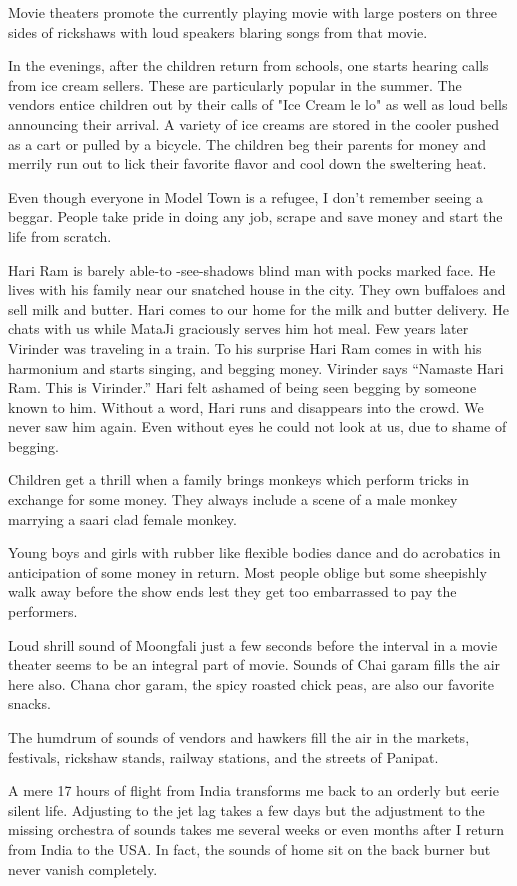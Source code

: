 Movie theaters promote the currently playing movie with large posters on
three sides of rickshaws with loud speakers blaring songs from that movie. 

In the evenings, after the children return from schools, one starts
hearing calls from ice cream sellers. These are particularly popular in
the summer. The vendors entice children out by their calls of "Ice Cream
le lo" as well as loud bells announcing their arrival. A variety of ice
creams are stored in the cooler pushed as a cart or pulled by a bicycle.
The children beg their parents for money and merrily run out to lick their
favorite flavor and cool down the sweltering heat. 

Even though everyone in Model Town is a refugee, I don’t remember seeing
a beggar. People take pride in doing any job, scrape and save money and
start the life from scratch. 

Hari Ram is barely able-to -see-shadows blind man with pocks marked face.
He lives with his family near our snatched house in the city. They own
buffaloes and sell milk and butter. Hari comes to our home for the milk
and butter delivery. He chats with us while MataJi graciously serves him
hot meal. Few years later Virinder was traveling in a train. To his
surprise Hari Ram comes in with his harmonium and starts singing, and
begging money. Virinder says “Namaste Hari Ram. This is Virinder.” Hari
felt ashamed of being seen begging by someone known to him. Without
a word, Hari runs and disappears into the crowd. We never saw him again.
Even without eyes he could not look at us, due to shame of begging. 

Children get a thrill when a family brings monkeys which perform tricks in
exchange for some money. They always include a scene of a male monkey
marrying a saari clad female monkey. 

Young boys and girls with rubber like flexible bodies dance and do
acrobatics in anticipation of some money in return. Most people oblige but
some sheepishly walk away before the show ends lest they get too
embarrassed to pay the performers. 

Loud shrill sound of Moongfali  just a few seconds before the interval in
a movie theater seems to be an integral part of movie. Sounds of Chai
garam fills the air here also.  Chana chor garam, the spicy roasted chick
peas, are also our favorite snacks. 

The humdrum of sounds of vendors and hawkers fill the air in the markets,
festivals, rickshaw stands, railway stations, and the streets of Panipat. 

A mere 17 hours of flight from India transforms me back to an orderly but
eerie silent life. Adjusting to the jet lag takes a few days but the
adjustment to the missing orchestra of sounds takes me several weeks or
even months after I return from India to the USA. In fact, the sounds of
home sit on the back burner but never vanish completely. 
